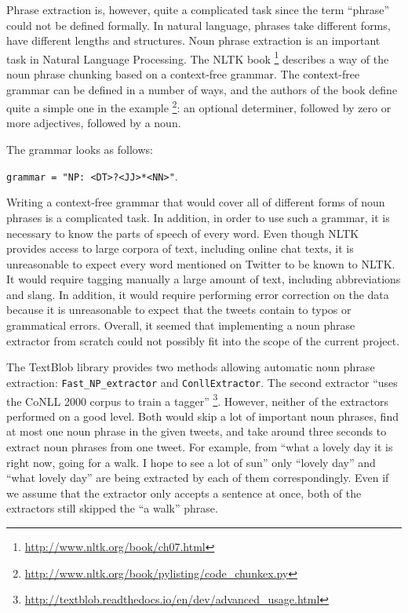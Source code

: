Phrase extraction is, however, quite a complicated task since the term ``phrase'' could not be defined formally. In natural language, phrases take different forms, have different lengths and structures. Noun phrase extraction is an important task in Natural Language Processing. The NLTK book \footnote{\url{http://www.nltk.org/book/ch07.html}} describes a way of the noun phrase chunking based on a context-free grammar. The context-free grammar can be defined in a number of ways, and the authors of the book define quite a simple one in the example \footnote{\url{http://www.nltk.org/book/pylisting/code_chunkex.py}}: 
an optional determiner, followed by zero or more adjectives, followed by a noun. 

The grammar looks as follows: 

\texttt{grammar = "NP: {<DT>?<JJ>*<NN>}"}. 

Writing a context-free grammar that would cover all of different forms of noun phrases is a complicated task. In addition, in order to use such a grammar, it is necessary to know the parts of speech of every word. Even though NLTK provides access to large corpora of text, including online chat texts, it is unreasonable to expect every word mentioned on Twitter to be known to NLTK. It would require tagging manually a large amount of text, including abbreviations and slang. In addition, it would require performing error correction on the data because it is unreasonable to expect that the tweets contain to typos or grammatical errors. Overall, it seemed that implementing a noun phrase extractor from scratch could not possibly fit into the scope of the current project.

The TextBlob library provides two methods allowing automatic noun phrase extraction: \texttt{Fast\_NP\_extractor} and \texttt{ConllExtractor}. The second extractor ``uses the CoNLL 2000 corpus to train a tagger'' \footnote{\url{http://textblob.readthedocs.io/en/dev/advanced_usage.html}}. However, neither of the extractors performed on a good level. Both would skip a lot of important noun phrases, find at most one noun phrase in the given tweets, and take around three seconds to extract noun phrases from one tweet. For example, from ``what a lovely day it is right now, going for a walk. I hope to see a lot of sun'' only ``lovely day'' and ``what lovely day'' are being extracted by each of them correspondingly. Even if we assume that the extractor only accepts a sentence at once, both of the extractors still skipped the ``a walk'' phrase.

